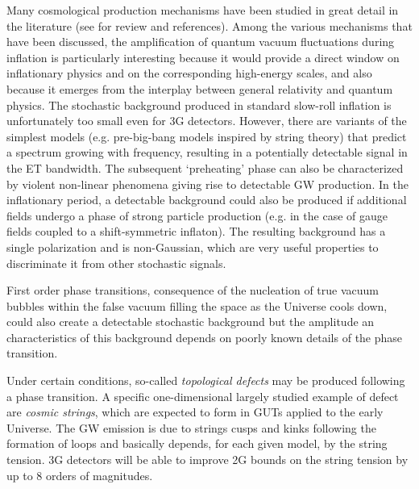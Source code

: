 Many cosmological production mechanisms have been studied in great detail in the literature (see \cite{Maggiore:1999vm,Caprini:2018mtu,Maggiore:2018zz} for review and references). Among the various mechanisms that have been discussed, the amplification of quantum vacuum fluctuations during inflation is particularly interesting because it would provide a direct window on inflationary physics and on the corresponding high-energy scales, and also because  it emerges from the interplay between general relativity and quantum physics. 
The stochastic background produced in   standard slow-roll inflation  is unfortunately too small even for 3G detectors. However, there are variants of the simplest models (e.g. pre-big-bang models inspired by string theory) that predict a spectrum growing with frequency, resulting in a potentially detectable signal in the ET bandwidth.
The subsequent `preheating' phase can also be characterized by violent non-linear phenomena giving rise to detectable GW production.
In the inflationary period, a detectable background could also be produced if additional fields undergo a phase of strong particle production (e.g. in the case of gauge fields coupled to a shift-symmetric inflaton). The resulting background has a single polarization and is non-Gaussian, which are very useful properties to discriminate it from other stochastic signals. 

First order phase transitions, consequence of the nucleation of true vacuum bubbles within the false vacuum filling the space as the Universe cools down, could also create a detectable stochastic background but the amplitude an characteristics of this background depends on poorly known details of the phase transition. 

Under certain conditions, so-called {\it topological defects} may be produced following a phase transition. A specific one-dimensional largely studied example of defect are {\it cosmic strings}, which are expected to form in GUTs applied to the early Universe. The GW emission is due to strings cusps and kinks following the formation of loops and basically depends, for each given model, by the string tension. 3G detectors will be able to improve 2G bounds on the string tension  by up to 8 orders of magnitudes.
      
